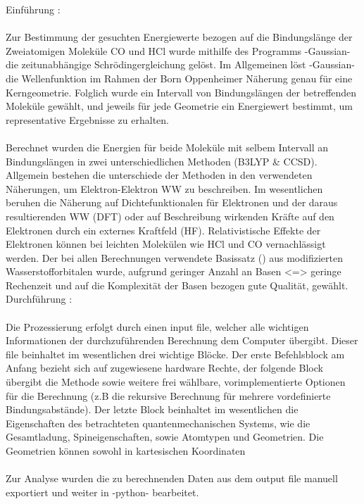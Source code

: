 \usepackage[utf8]{inputenc}
\usepackage[T1]{fontenc}
\usepackage[german]{babel}
\usepackage{amsmath} 
\usepackage{mathtools}
\usepackage{amssymb}
\usepackage{stmaryrd}
 
%
Einführung : \\
\\
Zur Bestimmung der gesuchten Energiewerte bezogen auf die Bindungslänge der Zweiatomigen Moleküle CO und HCl wurde mithilfe des Programms -Gaussian- die zeitunabhängige Schrödingergleichung gelöst. Im Allgemeinen löst -Gaussian- die Wellenfunktion im Rahmen der Born Oppenheimer Näherung genau für eine Kerngeometrie. Folglich wurde ein Intervall von Bindungslängen der betreffenden Moleküle gewählt, und jeweils für jede Geometrie ein Energiewert bestimmt, um representative Ergebnisse zu erhalten.\\	
\\
Berechnet wurden die Energien für beide Moleküle mit selbem Intervall an Bindungslängen in zwei unterschiedlichen Methoden (B3LYP \& CCSD). Allgemein bestehen die unterschiede der Methoden in den verwendeten Näherungen, um Elektron-Elektron WW zu beschreiben. Im wesentlichen beruhen die Näherung auf Dichtefunktionalen für Elektronen und der daraus resultierenden WW (DFT) oder auf Beschreibung wirkenden Kräfte auf den Elektronen durch ein externes Kraftfeld (HF). Relativistische Effekte der Elektronen können bei leichten Molekülen wie HCl und CO vernachlässigt werden. Der bei allen Berechnungen verwendete Basissatz () aus modifizierten Wasserstofforbitalen wurde, aufgrund geringer Anzahl an Basen <=> geringe Rechenzeit und auf die Komplexität der Basen bezogen gute Qualität, gewählt.\\
	
Durchführung : \\
\\
Die Prozessierung erfolgt durch einen input file, welcher alle wichtigen Informationen der durchzuführenden Berechnung dem Computer übergibt. Dieser file beinhaltet im wesentlichen drei wichtige Blöcke. Der erste Befehlsblock am Anfang bezieht sich auf zugewiesene hardware Rechte, der folgende Block übergibt die Methode sowie weitere frei wählbare, vorimplementierte Optionen für die Berechnung (z.B die rekursive Berechnung für mehrere vordefinierte Bindungsabstände). Der letzte Block beinhaltet im wesentlichen die Eigenschaften des betrachteten quantenmechanischen Systems, wie die Gesamtladung, Spineigenschaften, sowie Atomtypen und Geometrien. Die Geometrien können sowohl in kartesischen Koordinaten\\
\\
Zur Analyse wurden die zu berechnenden Daten aus dem output file manuell exportiert und weiter in -python- bearbeitet.

%